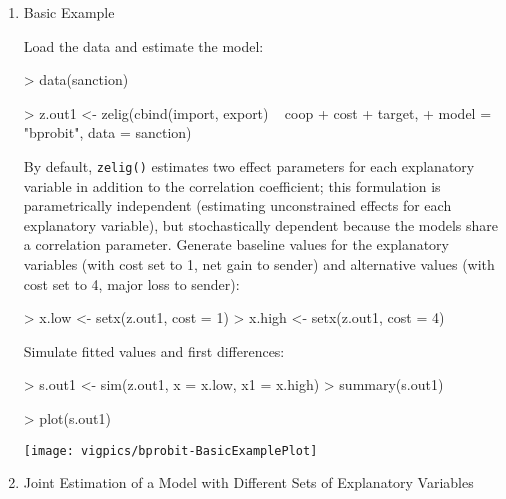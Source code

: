 \begin{enumerate}

\item {Basic Example} \label{basic.bp}

Load the data and estimate the model:  
\begin{Schunk}
\begin{Sinput}
> data(sanction)
\end{Sinput}
\end{Schunk}
\begin{Schunk}
\begin{Sinput}
> z.out1 <- zelig(cbind(import, export) ~ coop + cost + target, 
+     model = "bprobit", data = sanction)
\end{Sinput}
\end{Schunk}
By default, {\tt zelig()} estimates two effect parameters
for each explanatory variable in addition to the correlation coefficient;
this formulation is parametrically independent (estimating
unconstrained effects for each explanatory variable), but
stochastically dependent because the models share a correlation parameter.
\newline \newline Generate baseline values for the explanatory
variables (with cost set to 1, net gain to sender) and alternative
values (with cost set to 4, major loss to sender):
\begin{Schunk}
\begin{Sinput}
> x.low <- setx(z.out1, cost = 1)
> x.high <- setx(z.out1, cost = 4)
\end{Sinput}
\end{Schunk}
Simulate fitted values and first differences:  
\begin{Schunk}
\begin{Sinput}
> s.out1 <- sim(z.out1, x = x.low, x1 = x.high)
> summary(s.out1)
\end{Sinput}
\end{Schunk}
\begin{center}
\begin{Schunk}
\begin{Sinput}
> plot(s.out1)
\end{Sinput}
\end{Schunk}
\texttt{[image: vigpics/bprobit-BasicExamplePlot]}
\end{center}


\item {Joint Estimation of a Model with Different Sets of Explanatory Variables}\label{sto.dep.probit}


\end{enumerate}
